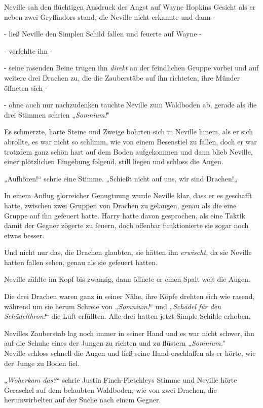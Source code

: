 {Neville sah den flüchtigen Ausdruck der Angst auf Wayne Hopkins Gesicht als er neben zwei Gryffindors stand, die Neville nicht erkannte und dann -

- ließ Neville den Simplen Schild fallen und feuerte auf Wayne -

- verfehlte ihn -

- seine rasenden Beine trugen ihn \emph{direkt} an der feindlichen Gruppe vorbei und auf weitere drei Drachen zu, die die Zauberstäbe auf ihn richteten, ihre Münder öffneten sich -

- ohne auch nur nachzudenken tauchte Neville zum Waldboden ab, gerade als die drei Stimmen schrien „\emph{Somnium!}"

Es schmerzte, harte Steine und Zweige bohrten sich in Neville hinein, als er sich abrollte, es war nicht so schlimm, wie von einem Besenstiel zu fallen, doch er war trotzdem ganz schön hart auf dem Boden aufgekommen und dann blieb Neville, einer plötzlichen Eingebung folgend, still liegen und schloss die Augen.

„Aufhören!“ schrie eine Stimme. „Schießt nicht auf uns, wir sind Drachen!„

In einem Anflug glorreicher Genugtuung wurde Neville klar, dass er es geschafft hatte, zwischen zwei Gruppen von Drachen zu gelangen, genau als die eine Gruppe auf ihn gefeuert hatte. Harry hatte davon gesprochen, als eine Taktik damit der Gegner zögerte zu feuern, doch offenbar funktionierte sie sogar noch etwas besser.

Und nicht nur das, die Drachen glaubten, sie hätten ihn \emph{erwischt,} da sie Neville hatten fallen sehen, genau als sie gefeuert hatten.

Neville zählte im Kopf bis zwanzig, dann öffnete er einen Spalt weit die Augen.

Die drei Drachen waren ganz in seiner Nähe, ihre Köpfe drehten sich wie rasend, während um sie herum Schreie von „\emph{Somnium!}“ und „\emph{Schädel für den Schädelthron!}“ die Luft erfüllten. Alle drei hatten jetzt Simple Schilde erhoben.

Nevilles Zauberstab lag noch immer in seiner Hand und es war nicht schwer, ihn auf die Schuhe eines der Jungen zu richten und zu flüstern „\emph{Somnium.}"\\ Neville schloss schnell die Augen und ließ seine Hand erschlaffen als er hörte, wie der Junge zu Boden fiel.

„\emph{Woherkam das?}“ schrie Justin Finch-Fletchleys Stimme und Neville hörte Geraschel auf dem belaubten Waldboden, wie von zwei Drachen, die herumwirbelten auf der Suche nach einem Gegner.

}
